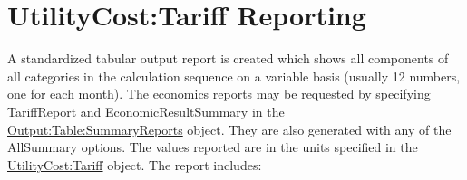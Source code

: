\section{UtilityCost:Tariff Reporting}\label{utilitycosttariff-reporting}

A standardized tabular output report is created which shows all components of all categories in the calculation sequence on a variable basis (usually 12 numbers, one for each month). The economics reports may be requested by specifying TariffReport and  EconomicResultSummary in the \hyperref[outputtablesummaryreports]{Output:Table:SummaryReports} object. They are also generated with any of the AllSummary options. The values reported are in the units specified in the \hyperref[utilitycosttariff]{UtilityCost:Tariff} object. The report includes: